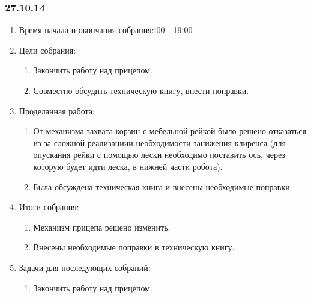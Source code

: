 	
\subsubsection{27.10.14}

\begin{enumerate}
	\item Время начала и окончания собрания::00 - 19:00
	\item Цели собрания:\newline
	\begin{enumerate}
	  \item Закончить работу над прицепом.\newline
	  
	  \item Совместно обсудить техническую книгу, внести поправки.\newline
	  
    \end{enumerate}
    
	\item Проделанная работа:\newline
	\begin{enumerate}
	  \item От механизма захвата корзин с мебельной рейкой было решено отказаться из-за сложной реализациии необходимости занижения клиренса (для опускания рейки с помощью лески необходимо поставить ось, через которую будет идти леска, в нижней части робота).\newline
      
      \item Была обсуждена техническая книга и внесены необходимые поправки.\newline
      
    \end{enumerate}
    
	\item Итоги собрания: \newline
	\begin{enumerate}
	  \item Механизм прицепа решено изменить.\newline
	  
	  \item Внесены необходимые поправки в техническую книгу.\newline
      
    \end{enumerate}
    
	\item Задачи для последующих собраний:\newline
	\begin{enumerate}
	  \item Закончить работу над прицепом.\newline
	  
    \end{enumerate}     
\end{enumerate}

\fillpage
